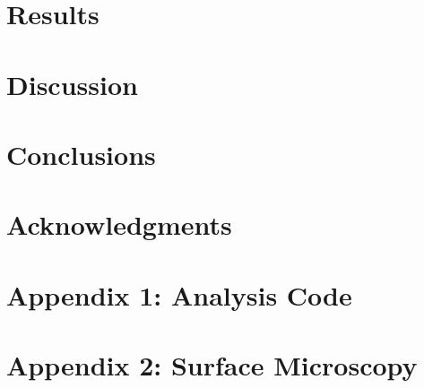\documentclass[12pt, titlepage]{article}
\begin{document}
\section{Results}



\section{Discussion}



\section{Conclusions}

\section{Acknowledgments}


\section{Appendix 1: Analysis Code}
\section{Appendix 2: Surface Microscopy}
\end{document}
